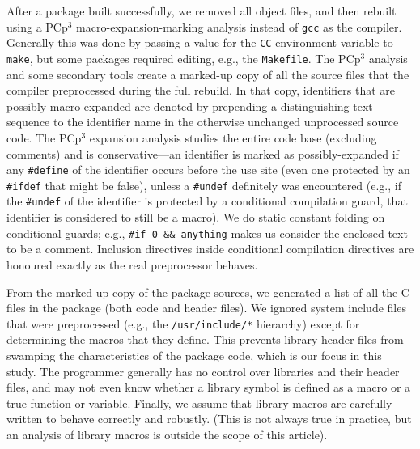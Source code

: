 \documentclass[10pt]{article}
\def\typeofdocument{article}    %
\newcommand{\pcp}{\mbox{\textsf{PCp}$^3$}}
\newcommand{\file}[1]{\texttt{#1}}
\newcommand{\ppd}[1]{\texttt{\##1}}
\begin{document}
After a package built successfully, we removed all object files, and
then rebuilt using a \pcp{} \cite{CppAwareCAnalyses}
macro-expansion-marking analysis instead of \texttt{gcc} as the
compiler.  Generally this was done by passing a value for the
\texttt{CC} environment variable to \texttt{make}, but some packages
required editing, e.g., the \texttt{Makefile}.  The \pcp{} analysis and
some secondary tools create a marked-up copy of all the source files
that the compiler preprocessed during the full rebuild.  In that copy,
identifiers that are possibly macro-expanded are denoted by prepending a
distinguishing text sequence to the identifier name in the otherwise
unchanged unprocessed source code.  The \pcp{} expansion analysis
studies the entire code base (excluding comments) and is
conservative---an identifier is marked as possibly-expanded if any
\ppd{define} of the identifier occurs before the use site (even one
protected by an \ppd{ifdef} that might be false), unless a \ppd{undef}
definitely was encountered (e.g., if the \ppd{undef} of the identifier
is protected by a conditional compilation guard, that identifier is
considered to still be a macro).  We do static constant folding on
conditional guards; e.g., \verb|#if 0 && anything| makes us consider the 
enclosed text to be a comment.  Inclusion directives inside conditional
compilation directives are honoured exactly as the real preprocessor
behaves.

From the marked up copy of the package sources, we generated a list of
all the C files in the package (both code and header files).  We ignored
system include files that were preprocessed (e.g., the
\file{/usr/include/*} hierarchy) except for determining the macros that
they define.  This prevents library header files from swamping the
characteristics of the package code, which is our focus in this study.
The programmer generally has no control over libraries and their header
files, and may not even know whether a library symbol is defined as a
macro or a true function or variable.  Finally, we assume that library
macros are carefully written to behave correctly and robustly.  (This is
not always true in practice, but an analysis of library macros is
outside the scope of this \typeofdocument).
\end{document}
